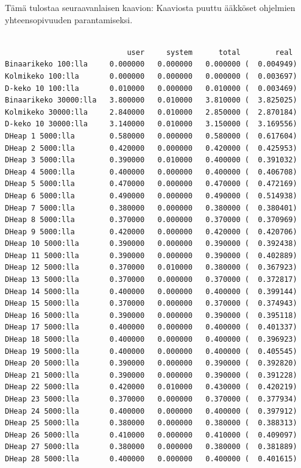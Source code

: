 \documentclass[a4paper,12pt]{article}
\begin{document}
Tämä tulostaa seuraavanlaisen kaavion:
Kaaviosta puuttu ääkköset ohjelmien yhteensopivuuden parantamiseksi.
\newpage
\scriptsize
\begin{verbatim}

                            user     system      total        real
Binaarikeko 100:lla     0.000000   0.000000   0.000000 (  0.004949)
Kolmikeko 100:lla       0.000000   0.000000   0.000000 (  0.003697)
D-keko 10 100:lla       0.010000   0.000000   0.010000 (  0.003469)
Binaarikeko 30000:lla   3.800000   0.010000   3.810000 (  3.825025)
Kolmikeko 30000:lla     2.840000   0.010000   2.850000 (  2.870184)
D-keko 10 30000:lla     3.140000   0.010000   3.150000 (  3.169556)
DHeap 1 5000:lla        0.580000   0.000000   0.580000 (  0.617604)
DHeap 2 5000:lla        0.420000   0.000000   0.420000 (  0.425953)
DHeap 3 5000:lla        0.390000   0.010000   0.400000 (  0.391032)
DHeap 4 5000:lla        0.400000   0.000000   0.400000 (  0.406708)
DHeap 5 5000:lla        0.470000   0.000000   0.470000 (  0.472169)
DHeap 6 5000:lla        0.490000   0.000000   0.490000 (  0.514938)
DHeap 7 5000:lla        0.380000   0.000000   0.380000 (  0.380401)
DHeap 8 5000:lla        0.370000   0.000000   0.370000 (  0.370969)
DHeap 9 5000:lla        0.420000   0.000000   0.420000 (  0.420706)
DHeap 10 5000:lla       0.390000   0.000000   0.390000 (  0.392438)
DHeap 11 5000:lla       0.390000   0.000000   0.390000 (  0.402889)
DHeap 12 5000:lla       0.370000   0.010000   0.380000 (  0.367923)
DHeap 13 5000:lla       0.370000   0.000000   0.370000 (  0.372817)
DHeap 14 5000:lla       0.400000   0.000000   0.400000 (  0.399144)
DHeap 15 5000:lla       0.370000   0.000000   0.370000 (  0.374943)
DHeap 16 5000:lla       0.390000   0.000000   0.390000 (  0.395118)
DHeap 17 5000:lla       0.400000   0.000000   0.400000 (  0.401337)
DHeap 18 5000:lla       0.400000   0.000000   0.400000 (  0.396923)
DHeap 19 5000:lla       0.400000   0.000000   0.400000 (  0.405545)
DHeap 20 5000:lla       0.390000   0.000000   0.390000 (  0.392820)
DHeap 21 5000:lla       0.390000   0.000000   0.390000 (  0.391228)
DHeap 22 5000:lla       0.420000   0.010000   0.430000 (  0.420219)
DHeap 23 5000:lla       0.370000   0.000000   0.370000 (  0.377934)
DHeap 24 5000:lla       0.400000   0.000000   0.400000 (  0.397912)
DHeap 25 5000:lla       0.380000   0.000000   0.380000 (  0.388313)
DHeap 26 5000:lla       0.410000   0.000000   0.410000 (  0.409097)
DHeap 27 5000:lla       0.380000   0.000000   0.380000 (  0.381889)
DHeap 28 5000:lla       0.400000   0.000000   0.400000 (  0.401615)

\end{verbatim}
\end{document}

